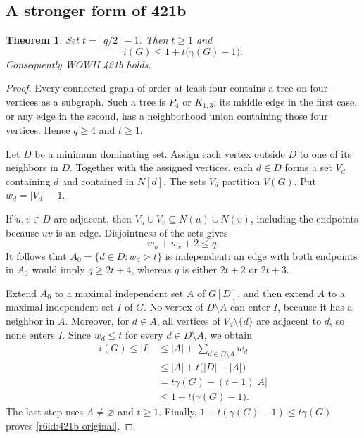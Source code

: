 \documentclass[11pt,a4paper]{article}
\newtheorem{theorem}{Theorem}[section]
\theoremstyle{remark}
\begin{document}
\subsection{A stronger form of 421b}
\label{r6id:sub421b}

\begin{theorem}\label{r6id:421b}
Set $t=\lfloor q/2\rfloor-1$.  Then $t\geq1$ and
\begin{equation}\label{r6id:421b-strong}
 i(G)\leq 1+t\bigl(\gamma(G)-1\bigr).
\end{equation}
Consequently WOWII 421b holds.
\end{theorem}
\begin{proof}
Every connected graph of order at least four contains a tree on four
vertices as a subgraph.  Such a tree is $P_4$ or $K_{1,3}$; its middle edge
in the first case, or any edge in the second, has a neighborhood union
containing those four vertices.  Hence $q\geq4$ and $t\geq1$.

Let $D$ be a minimum dominating set.  Assign each vertex outside $D$ to
one of its neighbors in $D$.  Together with the assigned vertices, each
$d\in D$ forms a set $V_d$ containing $d$ and contained in $N[d]$.
The sets $V_d$ partition $V(G)$.  Put $w_d=|V_d|-1$.

If $u,v\in D$ are adjacent, then
$V_u\cup V_v\subseteq N(u)\cup N(v)$, including the endpoints because
$uv$ is an edge.  Disjointness of the sets gives
\[
 w_u+w_v+2\leq q.
\]
It follows that $A_0=\{d\in D:w_d>t\}$ is independent: an edge with both
endpoints in $A_0$ would imply $q\geq2t+4$, whereas $q$ is either
$2t+2$ or $2t+3$.

Extend $A_0$ to a maximal independent set $A$ of $G[D]$, and then extend
$A$ to a maximal independent set $I$ of $G$.  No vertex of $D\setminus A$
can enter $I$, because it has a neighbor in $A$.  Moreover, for $d\in A$,
all vertices of $V_d\setminus\{d\}$ are adjacent to $d$, so none enters
$I$.  Since $w_d\leq t$ for every $d\in D\setminus A$, we obtain
\begin{align*}
 i(G)\leq |I|
 &\leq |A|+\sum_{d\in D\setminus A}w_d\\
 &\leq |A|+t\bigl(|D|-|A|\bigr)\\
 &=t\gamma(G)-(t-1)|A|\\
 &\leq 1+t\bigl(\gamma(G)-1\bigr).
\end{align*}
The last step uses $A\ne\varnothing$ and $t\geq1$.  Finally,
$1+t(\gamma(G)-1)\leq t\gamma(G)$ proves
\eqref{r6id:421b-original}.
\end{proof}
\end{document}
